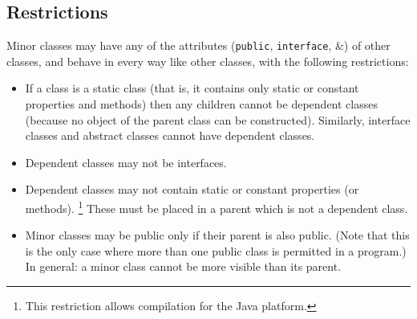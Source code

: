 \subsection{Restrictions}\label{refsminres}
 
Minor classes may have any of the attributes (\texttt{public},
\texttt{interface}, \&) of other classes, and behave in every way
like other classes, with the following restrictions:
\begin{itemize}
\item 
If a class is a static class (that is, it contains only static or
constant properties and methods) then any children cannot be dependent
classes (because no object of the parent class can be constructed).
Similarly, interface classes and abstract classes cannot have dependent
classes.
\item 
Dependent classes may not be interfaces.
\item 
{}
Dependent classes may not contain static or constant properties (or
methods).
\footnote{
This restriction allows compilation for the Java platform.
}
These must be placed in a parent which is not a dependent class.
\item 
Minor classes may be public only if their parent is also public.
(Note that this is the only case where more than one public class is
permitted in a program.)  In general: a minor class cannot be more
visible than its parent.
\end{itemize}
\index{,}
\index{,}
